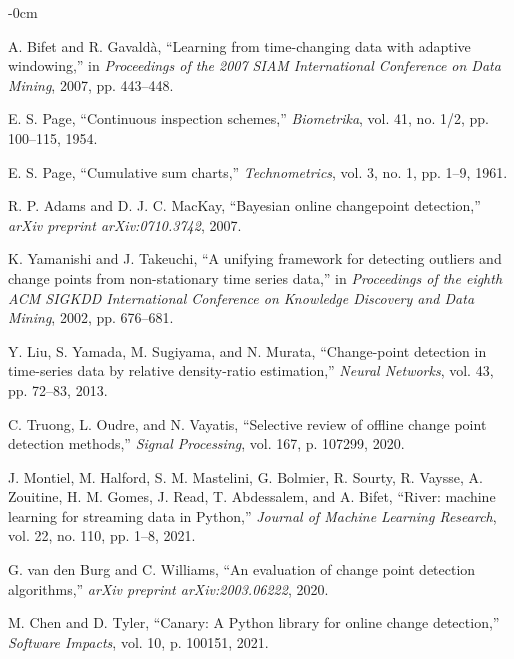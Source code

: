 \documentclass[journal,article,submit,pdftex,moreauthors]{Definitions/mdpi}
\begin{document}
\begin{adjustwidth}{-\extralength}{0cm}
\begin{thebibliography}{999}
A. Bifet and R. Gavaldà, ``Learning from time-changing data with adaptive windowing,'' in \emph{Proceedings of the 2007 SIAM International Conference on Data Mining}, 2007, pp. 443--448.

E. S. Page, ``Continuous inspection schemes,'' \emph{Biometrika}, vol. 41, no. 1/2, pp. 100--115, 1954.

E. S. Page, ``Cumulative sum charts,'' \emph{Technometrics}, vol. 3, no. 1, pp. 1--9, 1961.

R. P. Adams and D. J. C. MacKay, ``Bayesian online changepoint detection,'' \emph{arXiv preprint arXiv:0710.3742}, 2007.

K. Yamanishi and J. Takeuchi, ``A unifying framework for detecting outliers and change points from non-stationary time series data,'' in \emph{Proceedings of the eighth ACM SIGKDD International Conference on Knowledge Discovery and Data Mining}, 2002, pp. 676--681.

Y. Liu, S. Yamada, M. Sugiyama, and N. Murata, ``Change-point detection in time-series data by relative density-ratio estimation,'' \emph{Neural Networks}, vol. 43, pp. 72--83, 2013.

C. Truong, L. Oudre, and N. Vayatis, ``Selective review of offline change point detection methods,'' \emph{Signal Processing}, vol. 167, p. 107299, 2020.

J. Montiel, M. Halford, S. M. Mastelini, G. Bolmier, R. Sourty, R. Vaysse, A. Zouitine, H. M. Gomes, J. Read, T. Abdessalem, and A. Bifet, ``River: machine learning for streaming data in Python,'' \emph{Journal of Machine Learning Research}, vol. 22, no. 110, pp. 1--8, 2021.

G. van den Burg and C. Williams, ``An evaluation of change point detection algorithms,'' \emph{arXiv preprint arXiv:2003.06222}, 2020.

M. Chen and D. Tyler, ``Canary: A Python library for online change detection,'' \emph{Software Impacts}, vol. 10, p. 100151, 2021.


\end{thebibliography}
\end{adjustwidth}
\end{document}
